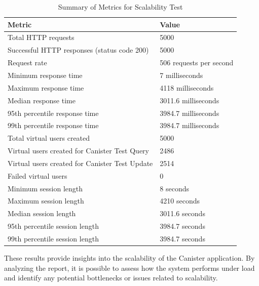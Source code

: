 \begin{table}[ht]
\caption{Summary of Metrics for Scalability Test}
\centering
\begin{tabular}{ll}
\hline
\textbf{Metric} & \textbf{Value} \\
\hline
Total HTTP requests & 5000 \\
Successful HTTP responses (status code 200) & 5000 \\
Request rate & 506 requests per second \\
Minimum response time & 7 milliseconds \\
Maximum response time & 4118 milliseconds \\
Median response time & 3011.6 milliseconds \\
95th percentile response time & 3984.7 milliseconds \\
99th percentile response time & 3984.7 milliseconds \\
Total virtual users created & 5000 \\
Virtual users created for Canister Test Query & 2486 \\
Virtual users created for Canister Test Update & 2514 \\
Failed virtual users & 0\\
Minimum session length & 8 seconds \\
Maximum session length & 4210 seconds \\
Median session length & 3011.6 seconds \\
95th percentile session length & 3984.7 seconds \\
99th percentile session length & 3984.7 seconds \\
\hline
\end{tabular}
\label{tab:performance-metrics}
\end{table}

These results provide insights into the scalability of the Canister application. By analyzing the report, it is possible to assess how the system performs under load and identify any potential bottlenecks or issues related to scalability.




